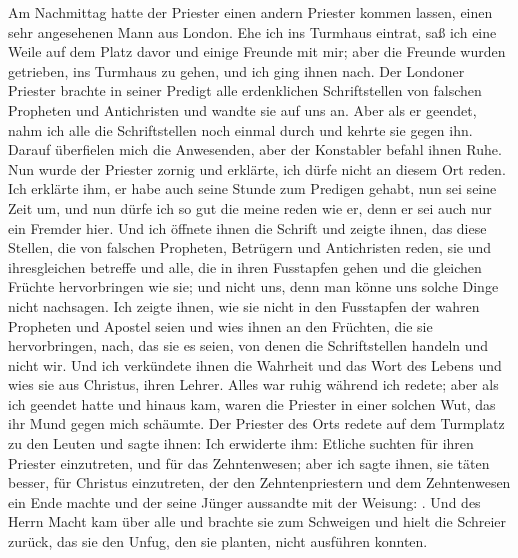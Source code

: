 Am Nachmittag hatte der Priester einen andern Priester
kommen lassen, einen sehr angesehenen Mann aus London. Ehe
ich ins Turmhaus eintrat, saß ich eine Weile auf dem Platz davor
und einige Freunde mit mir; aber die Freunde wurden getrieben, ins
Turmhaus zu gehen, und ich ging ihnen nach. Der Londoner
Priester brachte in seiner Predigt alle erdenklichen Schriftstellen
von falschen Propheten und 
Antichristen und wandte sie auf uns
an. Aber als er geendet, nahm ich alle die Schriftstellen noch
einmal durch und kehrte sie gegen ihn. Darauf überfielen mich
die Anwesenden, aber der Konstabler befahl ihnen Ruhe. Nun
wurde der Priester zornig und erklärte, ich dürfe nicht an diesem
Ort reden. Ich erklärte ihm, er habe auch seine Stunde zum
Predigen gehabt, nun sei seine Zeit um, und nun dürfe ich so
gut die meine reden wie er, denn er sei auch nur ein Fremder
hier. Und ich öffnete ihnen die Schrift und zeigte ihnen, das
diese Stellen, die von falschen Propheten, Betrügern und 
Antichristen reden, sie und ihresgleichen betreffe und alle, 
die in ihren
Fusstapfen gehen und die gleichen Früchte hervorbringen wie sie;
und nicht uns, denn man könne uns solche Dinge nicht 
nachsagen. Ich zeigte ihnen, wie sie nicht in den Fusstapfen der
wahren Propheten und Apostel seien und wies ihnen an den
Früchten, die sie hervorbringen, nach, das sie es seien, von denen
die Schriftstellen handeln und nicht wir. Und ich verkündete ihnen
die Wahrheit und das Wort des Lebens und wies sie aus Christus,
ihren Lehrer. Alles war ruhig während ich redete; aber als ich
geendet hatte und hinaus kam, waren die Priester in einer solchen
Wut, das ihr Mund gegen mich schäumte. Der Priester des
Orts redete auf dem Turmplatz zu den Leuten und sagte ihnen:
 Ich erwiderte ihm:  Etliche suchten für ihren Priester
einzutreten, und für das Zehntenwesen; 
aber ich sagte ihnen, sie
täten besser, für Christus einzutreten, der den Zehntenpriestern
und dem Zehntenwesen ein Ende machte und der seine Jünger
aussandte mit der Weisung: . Und des Herrn Macht kam über alle und brachte
sie zum Schweigen und hielt die Schreier zurück, das sie den Unfug,
den sie planten, nicht ausführen konnten. 


